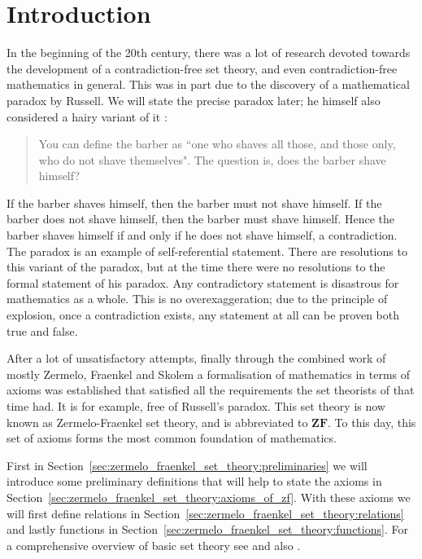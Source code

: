 \documentclass[../main.tex]{subfiles}
\begin{document}
\section*{Introduction}
In the beginning of the 20th century, there was a lot of research devoted towards the development of a contradiction-free set theory, and even contradiction-free mathematics in general. This was in part due to the discovery of a mathematical paradox by Russell. We will state the precise paradox later; he himself also considered a hairy variant of it \cite{Russell2009}:
\begin{quote}
    You can define the barber as ``one who shaves all those, and those only, who do not shave themselves". The question is, does the barber shave himself?
\end{quote}
If the barber shaves himself, then the barber must not shave himself. If the barber does not shave himself, then the barber must shave himself. Hence the barber shaves himself if and only if he does not shave himself, a contradiction. The paradox is an example of self-referential statement. There are resolutions to this variant of the paradox, but at the time there were no resolutions to the formal statement of his paradox. Any contradictory statement is disastrous for mathematics as a whole. This is no overexaggeration; due to the principle of explosion, once a contradiction exists, any statement at all can be proven both true and false.

After a lot of unsatisfactory attempts, finally through the combined work of mostly Zermelo, Fraenkel and Skolem a formalisation of mathematics in terms of axioms was established that satisfied all the requirements the set theorists of that time had. It is for example, free of Russell's paradox. This set theory is now known as Zermelo-Fraenkel set theory, and is abbreviated to $\mathbf{ZF}$. To this day, this set of axioms forms the most common foundation of mathematics.

First in Section~\ref{sec:zermelo_fraenkel_set_theory:preliminaries} we will introduce some preliminary definitions that will help to state the axioms in Section~\ref{sec:zermelo_fraenkel_set_theory:axioms_of_zf}. With these axioms we will first define relations in Section~\ref{sec:zermelo_fraenkel_set_theory:relations} and lastly functions in Section~\ref{sec:zermelo_fraenkel_set_theory:functions}. For a comprehensive overview of basic set theory see \cite{Levy1979} and also \cite{Kunen1992}.
\end{document}
